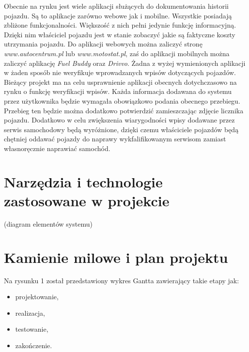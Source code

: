 \documentclass[12pt]{article}
\begin{document}
Obecnie na rynku jest wiele aplikacji służących do dokumentowania historii pojazdu. Są to aplikacje zarówno webowe jak i mobilne. Wszystkie posiadają zbliżone funkcjonalności. Większość z nich pełni jedynie funkcję informacyjną. Dzięki nim właściciel pojazdu jest w stanie zobaczyć jakie są faktyczne koszty utrzymania pojazdu. Do aplikacji webowych można zaliczyć stronę \textit{www.autocentrum.pl} lub \textit{www.motostat.pl}, zaś do aplikacji mobilnych można zaliczyć aplikację \textit{Fuel Buddy} oraz \textit{Drivvo}. Żadna z wyżej wymienionych aplikacji w żaden sposób nie weryfikuje wprowadzanych wpisów dotyczących pojazdów. Bieżący projekt ma na celu usprawnienie aplikacji obecnych dotychczasowo na rynku o funkcję weryfikacji wpisów. Każda informacja dodawana do systemu przez użytkownika będzie wymagała obowiązkowo podania obecnego przebiegu. Przebieg ten będzie można dodatkowo potwierdzić zamieszczając zdjęcie licznika pojazdu. Dodatkowo w celu zwiększenia wiarygodności wpisy dodawane przez serwis samochodowy będą wyróżnione, dzięki czemu właściciele pojazdów będą chętniej oddawać pojazdy do naprawy wykfalifikowanym serwisom zamiast własnoręcznie naprawiać samochód. 


\newpage
\section{Narzędzia i technologie zastosowane w projekcie}
(diagram elementów systemu)


\newpage
\section{Kamienie milowe i plan projektu}

\noindent Na rysunku 1 został przedstawiony wykres Gantta zawierający takie etapy jak: 
\begin{itemize}
\item projektowanie,
\item realizacja,
\item testowanie,
\item zakończenie.
\end{itemize}
\end{document}
